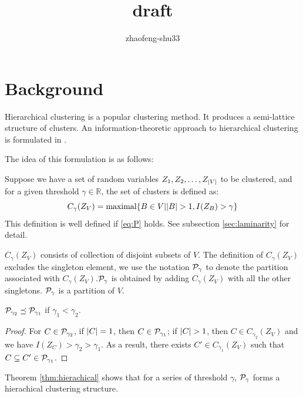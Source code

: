 \documentclass{article}
\begin{document}
\title{draft}
\author{zhaofeng-shu33}
\maketitle
\section{Background}
Hierarchical clustering is a popular clustering method. It produces a semi-lattice structure of clusters. 
An information-theoretic approach to hierarchical clustering is formulated in \cite{ic}.

The idea of this formulation is as follows:

Suppose we have a set of random variables $Z_1, Z_2, \dots, Z_{\abs{V}}$ to be clustered, and for a given threshold $\gamma \in \mathbb{R}$, the set of clusters is defined as:
\begin{equation}\label{eq:def_CgammaZV}
C_{\gamma}(Z_V) = \textrm{maximal}\{ B \in V \vert \abs{B} > 1, I(Z_B) > \gamma \}
\end{equation}
This definition is well defined if \eqref{eq:P} holds. See subsection \ref{sec:laminarity} for detail.

$C_{\gamma}(Z_V)$ consists of collection of disjoint subsets of $V$.
The definition of $C_{\gamma}(Z_V)$ excludes the singleton element,
we use the notation $\P_{\gamma}$ to denote the partition associated with $C_{\gamma}(Z_V)$.$\P_{\gamma}$ is obtained by adding $C_{\gamma}(Z_V)$ with all the other singletons.
$\P_{\gamma}$ is a partition of $V$.

\begin{theorem}\label{thm:hierachical}
$\P_{\gamma_2} \preceq \P_{\gamma_1}$ if $\gamma_1 < \gamma_2$.
\end{theorem}
\begin{proof}
For $C \in \P_{\gamma_2}$, if $\abs{C}=1$, then  $C\in \P_{\gamma_1}$;
if $\abs{C}>1$, then $C \in C_{\gamma_2}(Z_V)$ and we have $I(Z_C) > \gamma_2 > \gamma_1$.
As a result, there exists $C' \in C_{\gamma_1}(Z_V)$ such that $C\subseteq C' \in \P_{\gamma_1}$.
\end{proof}
\begin{remark}
Theorem \ref{thm:hierachical} shows that for a series of threshold $\gamma$, $\P_{\gamma}$ forms a hierachical clustering structure.
\end{remark}
\end{document}
